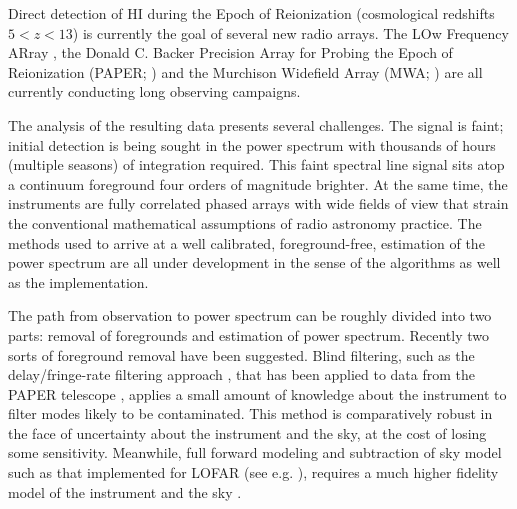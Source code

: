 \documentclass[preprint]{aastex}
\begin{document}
Direct detection of HI during the Epoch of Reionization (cosmological redshifts $5<z<13$) is currently the goal of several new radio arrays. The LOw Frequency ARray \citep[LOFAR;]{Yatawatta:2013p9699}, the Donald C. Backer Precision Array for Probing the Epoch of Reionization (PAPER; \citet{Parsons:2014p10499}) and the Murchison Widefield Array (MWA; \cite{Tingay:2013p9022,Bowman:2013p9950}) are all currently conducting long observing campaigns.

The analysis of the resulting data presents several challenges. The signal is faint; initial detection is being sought in the power spectrum with thousands of hours (multiple seasons) of integration required. This faint spectral line signal sits atop a continuum foreground four orders of magnitude brighter. At the same time, the instruments are fully correlated phased arrays with wide fields of view that strain the conventional mathematical assumptions of radio astronomy practice. The methods used to arrive at a well calibrated, foreground-free, estimation of the power spectrum are all under development in the sense of the algorithms as well as the implementation.  


The path from observation to power spectrum can be roughly divided into two parts: removal of foregrounds and estimation of power spectrum.  Recently two sorts of foreground removal have been suggested. Blind filtering, such as the delay/fringe-rate filtering approach \citep{Parsons:2012p8896,Liu:2014p10462,Liu:2014p10463},  that has been applied to data from the PAPER telescope \citep{Parsons:2014p10499}, applies a small amount of knowledge about the instrument to filter modes likely to be contaminated.  This method is comparatively robust in the face of uncertainty about the instrument and the sky, at the cost of losing some sensitivity. Meanwhile,  full forward modeling and subtraction of sky model such as that implemented for LOFAR (see e.g. \cite{Jelic:2008p2130,Yatawatta:2013p9699}), requires a much higher fidelity model of the instrument and the sky \citep{Datta:2010p8781,Vedantham:2012p10297}.  
\end{document}
